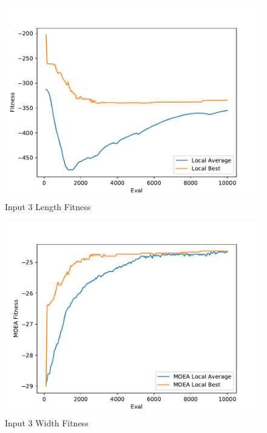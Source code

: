 \documentclass{standalone}
\begin{document}
\begin{figure}[!htb]
	\caption{Input 3 Length Fitness}
	\label{fig:graph_3002}
	\includegraphics[width=\textwidth]{../graphs/graphs/3002.pdf}
\end{figure}


\begin{figure}[!htb]
	\caption{Input 3 Width Fitness}
	\label{fig:graph_3002_moea}
	\includegraphics[width=\textwidth]{../graphs/graphs/3002_moea.pdf}
\end{figure}
\end{document}

